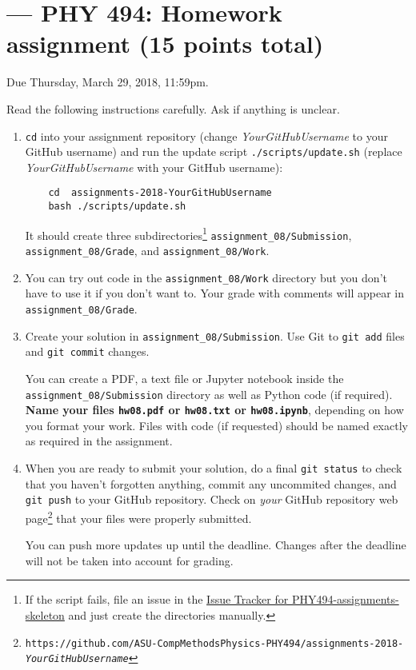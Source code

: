 \documentclass[letterpaper]{scrartcl}
\newcommand{\anumber}{8}
\newcommand{\anum}{0\anumber}
\begin{document}

\setcounter{section}{\anumber}
\addtocounter{section}{-1}
\section{ --- PHY 494: Homework assignment (15 points total)}

\noindent Due Thursday, March 29, 2018, 11:59pm.

\noindent
Read the following instructions carefully. Ask if anything is unclear.
\begin{enumerate}
\item \texttt{cd} into your assignment repository (change
  \emph{YourGitHubUsername} to your GitHub username) and run the
  update script \texttt{./scripts/update.sh} (replace
  \emph{YourGitHubUsername} with your GitHub username):
  \begin{verbatim}
    cd  assignments-2018-YourGitHubUsername
    bash ./scripts/update.sh
  \end{verbatim}
  It should create three subdirectories\footnote{If the script fails,
    file an issue in the
    \href{https://github.com/ASU-CompMethodsPhysics-PHY494/PHY494-assignments-skeleton/issues}{Issue
      Tracker for PHY494-assignments-skeleton} and just create the
    directories manually.} \texttt{assignment\_\anum/Submission},
  \texttt{assignment\_\anum/Grade}, and
  \texttt{assignment\_\anum/Work}.
\item You can try out code in the \texttt{assignment\_\anum/Work}
  directory but you don't have to use it if you don't want to. Your
  grade with comments will appear in
  \texttt{assignment\_\anum/Grade}.
\item Create your solution in
  \texttt{assignment\_\anum/Submission}. Use Git to \texttt{git
    add} files and \texttt{git commit} changes.

  You can create a PDF, a text file or Jupyter notebook inside the
  \texttt{assignment\_\anum/Submission} directory as well as Python
  code (if required). \textbf{Name your files \texttt{hw\anum.pdf} or
    \texttt{hw\anum.txt} or \texttt{hw\anum.ipynb}}, depending on how
  you format your work. Files with code (if requested) should be named
  exactly as required in the assignment.
\item When you are ready to submit your solution, do a final
  \texttt{git status} to check that you haven't forgotten anything,
  commit any uncommited changes, and \texttt{git push} to your GitHub
  repository. Check on \emph{your} GitHub repository web
  page\footnote{\texttt{https://github.com/ASU-CompMethodsPhysics-PHY494/assignments-2018-\emph{YourGitHubUsername}}}
  that your files were properly submitted.

  You can push more updates up until the deadline. Changes after the
  deadline will not be taken into account for grading.
\end{enumerate}
\end{document}
